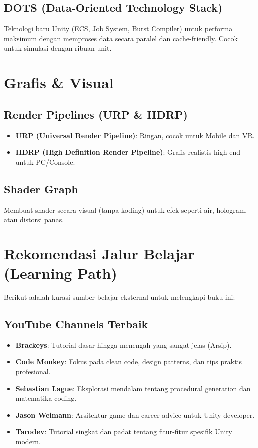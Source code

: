 \subsection{DOTS (Data-Oriented Technology Stack)}
Teknologi baru Unity (ECS, Job System, Burst Compiler) untuk performa maksimum dengan memproses data secara paralel dan cache-friendly. Cocok untuk simulasi dengan ribuan unit.

\section{Grafis \& Visual}

\subsection{Render Pipelines (URP \& HDRP)}
\begin{itemize}
    \item \textbf{URP (Universal Render Pipeline)}: Ringan, cocok untuk Mobile dan VR.
    \item \textbf{HDRP (High Definition Render Pipeline)}: Grafis realistis high-end untuk PC/Console.
\end{itemize}

\subsection{Shader Graph}
Membuat shader secara visual (tanpa koding) untuk efek seperti air, hologram, atau distorsi panas.

\section{Rekomendasi Jalur Belajar (Learning Path)}

Berikut adalah kurasi sumber belajar eksternal untuk melengkapi buku ini:

\subsection{YouTube Channels Terbaik}
\begin{itemize}
    \item \textbf{Brackeys}: Tutorial dasar hingga menengah yang sangat jelas (Arsip).
    \item \textbf{Code Monkey}: Fokus pada clean code, design patterns, dan tips praktis profesional.
    \item \textbf{Sebastian Lague}: Eksplorasi mendalam tentang procedural generation dan matematika coding.
    \item \textbf{Jason Weimann}: Arsitektur game dan career advice untuk Unity developer.
    \item \textbf{Tarodev}: Tutorial singkat dan padat tentang fitur-fitur spesifik Unity modern.
\end{itemize}

